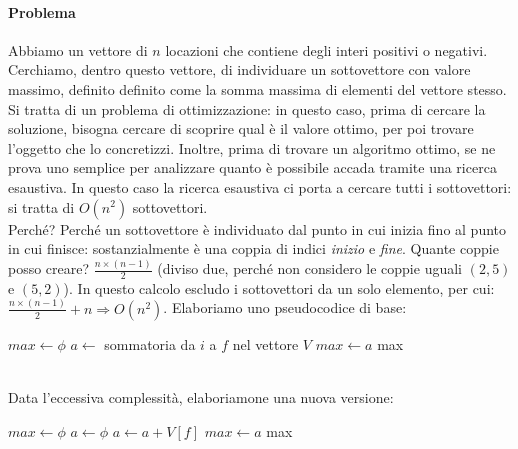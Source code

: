 \paragraph{Problema}
Abbiamo un vettore di $n$ locazioni che contiene degli interi positivi o negativi. Cerchiamo, dentro questo vettore, di individuare un sottovettore con valore massimo, definito definito come la somma massima di elementi del vettore stesso. \\
Si tratta di un problema di ottimizzazione: in questo caso, prima di cercare la soluzione, bisogna cercare di scoprire qual è il valore ottimo, per poi trovare l'oggetto che lo concretizzi. Inoltre, prima di trovare un algoritmo ottimo, se ne prova uno semplice per analizzare quanto è possibile accada tramite una ricerca esaustiva. In questo caso la ricerca esaustiva ci porta a cercare tutti i sottovettori: si tratta di $O(n^2)$ sottovettori. \\
Perché? Perché un sottovettore è individuato dal punto in cui inizia fino al punto in cui finisce: sostanzialmente è una coppia di indici \textit{inizio} e \textit{fine}. Quante coppie posso creare? $\frac{n\times(n-1)}{2}$ (diviso due, perché non considero le coppie uguali $(2,5)$ e $(5,2)$). In questo calcolo escludo i sottovettori da un solo elemento, per cui: $\frac{n\times(n-1)}{2} + n \Rightarrow O(n^2)$. Elaboriamo uno pseudocodice di base:
\begin{algorithm}
	\label{alg:subV1}
	\begin{algorithmic}
			\State $max \gets \phi$
					\State $a \gets$ sommatoria da $i$ a $f$ nel vettore $V$
						\State $max \gets a$
					\EndIf
				\EndFor
			\EndFor
			\State \Return max
		\EndFunction
	\end{algorithmic}
\end{algorithm} \hfill \\
Data l'eccessiva complessità, elaboriamone una nuova versione:
\begin{algorithm}
	\label{alg:subV2}
	\begin{algorithmic}
		\Function{subvectorV2}{V}
			\State $max \gets \phi$
			\For { $i \gets 1$ to $n-1$ }
				\State $a \gets \phi$
				\For { $f \gets 1$ to $n$ }
					\State $a \gets a + V[f]$
					\If { $a > max$ }
						\State $max \gets a$
					\EndIf
				\EndFor
			\EndFor
			\State \Return max
		\EndFunction
	\end{algorithmic}
\end{algorithm} \hfill \\
